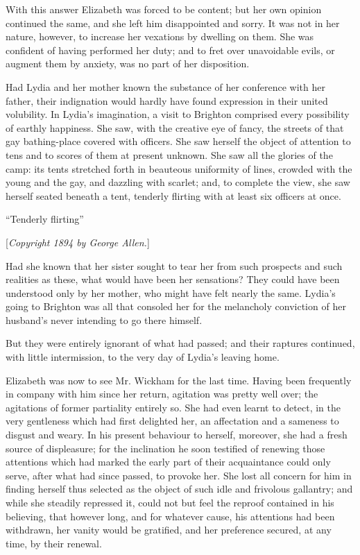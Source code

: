 \documentclass[12pt,openright]{book}
\begin{document}
With this answer Elizabeth was forced to be content; but her own opinion continued the same, and she left him disappointed and sorry. It was not in her nature, however, to increase her vexations by dwelling on them. She was confident of having performed her duty; and to fret over unavoidable evils, or augment them by anxiety, was no part of her disposition.

Had Lydia and her mother known the substance of her conference with her father, their indignation would hardly have found expression in their united volubility. In Lydia’s imagination, a visit to Brighton comprised every possibility of earthly happiness. She saw, with the creative eye of fancy, the streets of that gay bathing-place covered with officers. She saw herself the object of attention to tens and to scores of them at present unknown. She saw all the glories of the camp: its tents stretched forth in beauteous uniformity of lines, crowded with the young and the gay, and dazzling with scarlet; and, to complete the view, she saw herself seated beneath a tent, tenderly flirting with at least six officers at once.

“Tenderly flirting”


[\textit{Copyright 1894 by George Allen.}]

Had she known that her sister sought to tear her from such prospects and such realities as these, what would have been her sensations? They could have been understood only by her mother, who might have felt nearly the same. Lydia’s going to Brighton was all that consoled her for the melancholy conviction of her husband’s never intending to go there himself.

But they were entirely ignorant of what had passed; and their raptures continued, with little intermission, to the very day of Lydia’s leaving home.

Elizabeth was now to see Mr. Wickham for the last time. Having been frequently in company with him since her return, agitation was pretty well over; the agitations of former partiality entirely so. She had even learnt to detect, in the very gentleness which had first delighted her, an affectation and a sameness to disgust and weary. In his present behaviour to herself, moreover, she had a fresh source of displeasure; for the inclination he soon testified of renewing those attentions which had marked the early part of their acquaintance could only serve, after what had since passed, to provoke her. She lost all concern for him in finding herself thus selected as the object of such idle and frivolous gallantry; and while she steadily repressed it, could not but feel the reproof contained in his believing, that however long, and for whatever cause, his attentions had been withdrawn, her vanity would be gratified, and her preference secured, at any time, by their renewal.
\end{document}
